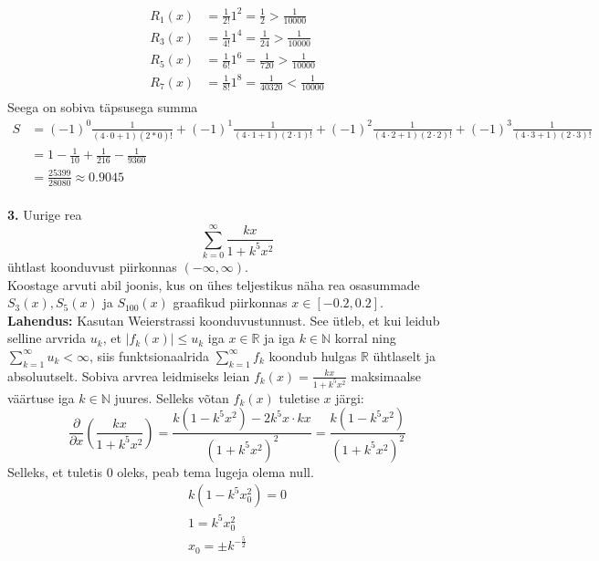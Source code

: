 \documentclass{article}
\begin{document}
\begin{equation*}
\begin{aligned}
R_1(x)&=\frac{1}{2!}1^{2}=\frac{1}{2}>\frac{1}{10000}\\
R_3(x)&=\frac{1}{4!}1^4=\frac{1}{24}>\frac{1}{10000}\\
R_5(x)&=\frac{1}{6!}1^6=\frac{1}{720}>\frac{1}{10000}\\
R_7(x)&=\frac{1}{8!}1^8=\frac{1}{40320}<\frac{1}{10000}\\
\end{aligned}
\end{equation*}
Seega on sobiva t\"apsusega summa 
\begin{equation*}
\begin{aligned}
S&=(-1)^0\frac{1}{(4\cdot0+1)(2*0)!}+(-1)^1\frac{1}{(4\cdot1+1)(2\cdot1)!}+(-1)^2\frac{1}{(4\cdot2+1)(2\cdot2)!}+(-1)^3\frac{1}{(4\cdot3+1)(2\cdot3)!}\\
&=1-\frac{1}{10}+\frac{1}{216}-\frac{1}{9360}\\
&=\frac{25399}{28080}\approx0.9045
\end{aligned}
\end{equation*}
\pagebreak\\
\textbf{3.} Uurige rea
\begin{equation*}
\sum_{k=0}^\infty\frac{kx}{1+k^5x^2}
\end{equation*}
\"uhtlast koonduvust piirkonnas $(-\infty,\infty)$.\\
Koostage arvuti abil joonis, kus on \"uhes teljestikus n\"aha rea osasummade $S_3(x), S_5(x)$ ja $S_{100}(x)$ graafikud piirkonnas $x\in[-0.2,0.2]$.\\
\textbf{Lahendus:}
Kasutan Weierstrassi koonduvustunnust. See \"utleb, et kui leidub selline arvrida $u_k$, et $|f_k(x)|\leq u_k$ iga $x\in\mathbb{R}$ ja iga $k\in\mathbb{N}$ korral ning $\sum_{k=1}^\infty u_k<\infty$, siis funktsionaalrida $\sum_{k=1}^\infty f_k$ koondub hulgas $\mathbb{R}$ \"uhtlaselt ja absoluutselt. Sobiva arvrea leidmiseks leian $f_k(x)=\frac{kx}{1+k^5x^2}$ maksimaalse v\"a\"artuse iga $k\in\mathbb{N}$ juures. Selleks v\~otan $f_k(x)$ tuletise $x$ j\"argi:
\begin{equation*}
\frac{\partial}{\partial x}\left(\frac{kx}{1+k^5x^2}\right)=\frac{k(1-k^5x^2)-2k^5x\cdot kx}{(1+k^5x^2)^2}=\frac{k(1-k^5x^2)}{(1+k^5x^2)^2}
\end{equation*}
Selleks, et tuletis 0 oleks, peab tema lugeja olema null.
\begin{equation*}
\begin{aligned}
k(1-k^5x_0^2)=0\\
1=k^5x_0^2\\
x_0=\pm k^{-\frac{5}{2}}
\end{aligned}
\end{equation*}
\end{document}
